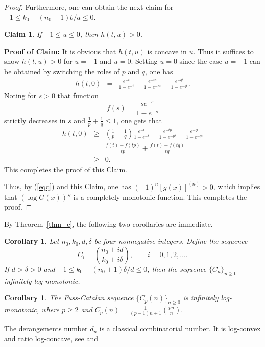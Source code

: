 \documentclass[12pt,reqno]{article}
\newtheorem{cor}[thm]{Corollary}
\newtheorem{cl}{Claim}
\theoremstyle{definition}
\newcommand{\D}{d}
\renewcommand{\d}{\delta}
\numberwithin{equation}{section}
\begin{document}
\begin{proof}
Furthermore, one can obtain the next claim for $-1\leq
k_0-(n_0+1)b/a\leq0$.
\begin{cl}
If $-1\leq u\leq 0$, then $h(t,u)>0$.
\end{cl}
\textbf{Proof of Claim:} It is obvious that $h(t, u)$ is concave in
$u$. Thus it suffices to show $h(t, u)> 0$ for $u =-1$ and $u = 0$.
Setting $u = 0$ since the case $u =-1$ can be obtained by switching
the roles of $p$ and $q$, one has
\begin{eqnarray*}
h(t,0)&=&\frac{e^{-t}}{1-e^{-t}}-\frac{e^{-tp}}{1-e^{-pt}}-\frac{e^{-qt}}{1-e^{-qt}}.
\end{eqnarray*}
Noting for $s>0$ that function $$f(s)=\frac{se^{-s}}{1-e^{-s}}$$
strictly decreases in $s$ and $\frac{1}{p}+\frac{1}{q}\leq1$, one
gets that
\begin{eqnarray*}
h(t,0)&\geq&(\frac{1}{p}+\frac{1}{q})\frac{e^{-t}}{1-e^{-t}}-\frac{e^{-tp}}{1-e^{-pt}}-\frac{e^{-qt}}{1-e^{-qt}}\\
&=&\frac{f(t)-f(tp)}{tp}+\frac{f(t)-f(tq)}{tq}\\
&\ge&0.
\end{eqnarray*}
 This completes the proof of this
Claim.


Thus, by (\ref{eqq}) and this Claim, one has $(-1)^n[g(x)]^{(n)}>0$,
which implies that $(\log G(x))''$ is a completely monotonic
function. This completes the proof.
\end{proof}
By Theorem~\ref{thm+e}, the following two corollaries are immediate.
\begin{cor}
Let $n_{0},k_{0},\D,\d$ be four nonnegative integers. Define the
sequence
\begin{equation*}\label{ai}
    C_i=\binom{n_{0}+i\D}{k_0+i\d},\qquad i=0,1,2,\ldots.
\end{equation*}
If $\D>\d>0$ and $-1\leq k_0-(n_0+1)\d/\D\leq0$, then the sequence
$\{C_n\}_{n\geq0}$ infinitely log-monotonic.
\end{cor}
\begin{cor}
The Fuss-Catalan sequence $\{C_p(n)\}_{n\geq0}$ is  infinitely
log-monotonic, where $p\geq 2$ and
$C_p(n)=\frac{1}{(p-1)n+1}\binom{pn}{n}.$
\end{cor}
The derangements number $d_n$ is a classical combinatorial number.
It is log-convex and ratio log-concave, see \cite{LW07} and
\end{document}
